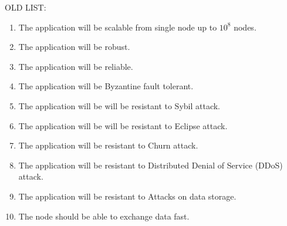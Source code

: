 OLD LIST:
\begin{enumerate}
\item The application will be scalable from single node up to \(10^8\) nodes.
\item The application will be robust.
\item The application will be reliable.
\item The application will be Byzantine fault tolerant.
\item The application will be will be resistant to Sybil attack.
\item The application will be will be resistant to Eclipse attack.
\item The application will be resistant to Churn attack.
\item The application will be resistant to Distributed Denial of Service (DDoS) attack.
\item The application will be resistant to Attacks on data storage.
\item The node should be able to exchange data fast.
\end{enumerate}

\vspace{\baselineskip}